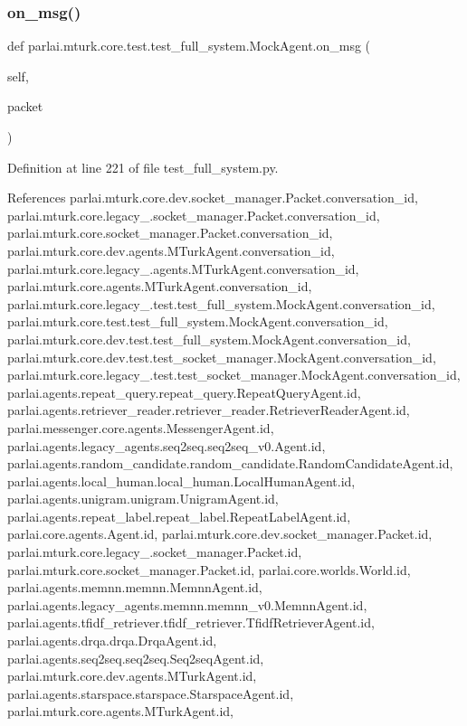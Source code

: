 \subsubsection{\texorpdfstring{on\+\_\+msg()}{on\_msg()}}
{\footnotesize\ttfamily def parlai.\+mturk.\+core.\+test.\+test\+\_\+full\+\_\+system.\+Mock\+Agent.\+on\+\_\+msg (\begin{DoxyParamCaption}\item[{}]{self,  }\item[{}]{packet }\end{DoxyParamCaption})}



Definition at line 221 of file test\+\_\+full\+\_\+system.\+py.



References parlai.\+mturk.\+core.\+dev.\+socket\+\_\+manager.\+Packet.\+conversation\+\_\+id, parlai.\+mturk.\+core.\+legacy\+\_.\+socket\+\_\+manager.\+Packet.\+conversation\+\_\+id, parlai.\+mturk.\+core.\+socket\+\_\+manager.\+Packet.\+conversation\+\_\+id, parlai.\+mturk.\+core.\+dev.\+agents.\+M\+Turk\+Agent.\+conversation\+\_\+id, parlai.\+mturk.\+core.\+legacy\+\_.\+agents.\+M\+Turk\+Agent.\+conversation\+\_\+id, parlai.\+mturk.\+core.\+agents.\+M\+Turk\+Agent.\+conversation\+\_\+id, parlai.\+mturk.\+core.\+legacy\+\_.\+test.\+test\+\_\+full\+\_\+system.\+Mock\+Agent.\+conversation\+\_\+id, parlai.\+mturk.\+core.\+test.\+test\+\_\+full\+\_\+system.\+Mock\+Agent.\+conversation\+\_\+id, parlai.\+mturk.\+core.\+dev.\+test.\+test\+\_\+full\+\_\+system.\+Mock\+Agent.\+conversation\+\_\+id, parlai.\+mturk.\+core.\+dev.\+test.\+test\+\_\+socket\+\_\+manager.\+Mock\+Agent.\+conversation\+\_\+id, parlai.\+mturk.\+core.\+legacy\+\_.\+test.\+test\+\_\+socket\+\_\+manager.\+Mock\+Agent.\+conversation\+\_\+id, parlai.\+agents.\+repeat\+\_\+query.\+repeat\+\_\+query.\+Repeat\+Query\+Agent.\+id, parlai.\+agents.\+retriever\+\_\+reader.\+retriever\+\_\+reader.\+Retriever\+Reader\+Agent.\+id, parlai.\+messenger.\+core.\+agents.\+Messenger\+Agent.\+id, parlai.\+agents.\+legacy\+\_\+agents.\+seq2seq.\+seq2seq\+\_\+v0.\+Agent.\+id, parlai.\+agents.\+random\+\_\+candidate.\+random\+\_\+candidate.\+Random\+Candidate\+Agent.\+id, parlai.\+agents.\+local\+\_\+human.\+local\+\_\+human.\+Local\+Human\+Agent.\+id, parlai.\+agents.\+unigram.\+unigram.\+Unigram\+Agent.\+id, parlai.\+agents.\+repeat\+\_\+label.\+repeat\+\_\+label.\+Repeat\+Label\+Agent.\+id, parlai.\+core.\+agents.\+Agent.\+id, parlai.\+mturk.\+core.\+dev.\+socket\+\_\+manager.\+Packet.\+id, parlai.\+mturk.\+core.\+legacy\+\_.\+socket\+\_\+manager.\+Packet.\+id, parlai.\+mturk.\+core.\+socket\+\_\+manager.\+Packet.\+id, parlai.\+core.\+worlds.\+World.\+id, parlai.\+agents.\+memnn.\+memnn.\+Memnn\+Agent.\+id, parlai.\+agents.\+legacy\+\_\+agents.\+memnn.\+memnn\+\_\+v0.\+Memnn\+Agent.\+id, parlai.\+agents.\+tfidf\+\_\+retriever.\+tfidf\+\_\+retriever.\+Tfidf\+Retriever\+Agent.\+id, parlai.\+agents.\+drqa.\+drqa.\+Drqa\+Agent.\+id, parlai.\+agents.\+seq2seq.\+seq2seq.\+Seq2seq\+Agent.\+id, parlai.\+mturk.\+core.\+dev.\+agents.\+M\+Turk\+Agent.\+id, parlai.\+agents.\+starspace.\+starspace.\+Starspace\+Agent.\+id, parlai.\+mturk.\+core.\+agents.\+M\+Turk\+Agent.\+id, 